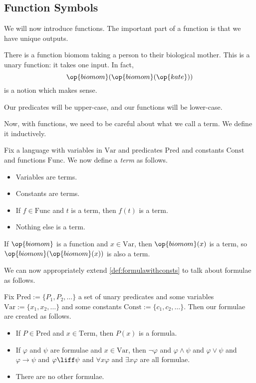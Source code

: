 \subsection{Function Symbols}
We will now introduce functions. The important part of a function is that we have unique outputs.
\begin{example}
	There is a function $\mathrm{biomom}$ taking a person to their biological mother. This is a unary function: it takes one input. In fact,
	\[\op{biomom}(\op{biomom}(\op{kate}))\]
	is a notion which makes sense.
\end{example}
\begin{remark}
	Our predicates will be upper-case, and our functions will be lower-case.
\end{remark}
Now, with functions, we need to be careful about what we call a term. We define it inductively.
\begin{definition}[Term]
	Fix a language with variables in $\mathrm{Var}$ and predicates $\mathrm{Pred}$ and constants $\mathrm{Const}$ and functions $\mathrm{Func}$. We now define a \textit{term} as follows.
	\begin{itemize}
		\item Variables are terms.
		\item Constants are terms.
		\item If $f\in\mathrm{Func}$ and $t$ is a term, then $f(t)$ is a term.
		\item Nothing else is a term.
	\end{itemize}
\end{definition}
\begin{example}
	If $\op{biomom}$ is a function and $x\in\mathrm{Var}$, then $\op{biomom}(x)$ is a term, so $\op{biomom}(\op{biomom}(x))$ is also a term.
\end{example}
We can now appropriately extend \autoref{def:formulawithconsts} to talk about formulae as follows.
\begin{defihelper}
	Fix $\mathrm{Pred}:=\{P_1,P_2,\ldots\}$ a set of unary predicates and some variables $\mathrm{Var}:=\{x_1,x_2,\ldots\}$ and some constants $\mathrm{Const}:=\{c_1,c_2,\ldots\}$. Then our formulae are created as follows.
	\begin{itemize}
		\item If $P\in\mathrm{Pred}$ and $x\in\mathrm{Term}$, then $P(x)$ is a formula.
		\item If $\varphi$ and $\psi$ are formulae and $x\in\mathrm{Var}$, then $\lnot\varphi$ and $\varphi\land\psi$ and $\varphi\lor\psi$ and $\varphi\to\psi$ and $\varphi\liff\psi$ and $\forall x\varphi$ and $\exists x\varphi$ are all formulae.
		\item There are no other formulae.
	\end{itemize}
\end{defihelper}
